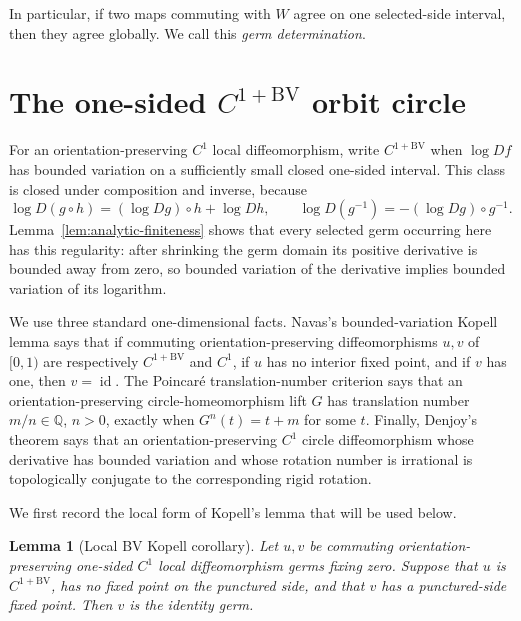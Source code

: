 \documentclass[11pt]{article}
\newtheorem{lemma}[theorem]{Lemma}
\theoremstyle{definition}
\theoremstyle{remark}
\newcommand{\id}{\operatorname{id}}
\begin{document}
In particular, if two maps commuting with \(W\) agree on one selected-side
interval, then they agree globally.  We call this \emph{germ
determination}.

\section{The one-sided \texorpdfstring{\(C^{1+\mathrm{BV}}\)}{C1+BV} orbit circle}

For an orientation-preserving \(C^1\) local diffeomorphism, write
\(C^{1+\mathrm{BV}}\) when \(\log Df\) has bounded variation on a sufficiently
small closed one-sided interval.  This class is closed under composition and
inverse, because
\[
 \log D(g\circ h)=(\log Dg)\circ h+\log Dh,
 \qquad
 \log D(g^{-1})=-(\log Dg)\circ g^{-1}.
\]
Lemma~\ref{lem:analytic-finiteness} shows that every selected germ occurring
here has this regularity: after shrinking the germ domain its positive
derivative is bounded away from zero, so bounded variation of the derivative
implies bounded variation of its logarithm.

We use three standard one-dimensional facts.  Navas's
bounded-variation Kopell lemma \cite[Theorem 4.1.1]{Navas} says that if
commuting orientation-preserving diffeomorphisms $u,v$ of $[0,1)$ are
respectively $C^{1+\mathrm{BV}}$ and $C^1$, if $u$ has no interior fixed
point, and if $v$ has one, then $v=\id$.  The Poincar\'e translation-number
criterion \cite[Propositions 2.2.2 and 2.2.3]{Navas} says that an
orientation-preserving circle-homeomorphism lift $G$ has translation number
$m/n\in\mathbb Q$, $n>0$, exactly when $G^n(t)=t+m$ for some $t$.
Finally, Denjoy's theorem
\cite[Theorem 3.1.1]{Navas} says that an orientation-preserving $C^1$ circle
diffeomorphism whose derivative has bounded variation and whose rotation
number is irrational is topologically conjugate to the corresponding rigid
rotation.

We first record the local form of Kopell's lemma that will be used below.

\begin{lemma}[Local BV Kopell corollary]\label{lem:local-BV-Kopell}
Let \(u,v\) be commuting orientation-preserving one-sided \(C^1\) local
diffeomorphism germs fixing zero.  Suppose that \(u\) is
\(C^{1+\mathrm{BV}}\), has no fixed point on the punctured side, and that
\(v\) has a punctured-side fixed point.  Then \(v\) is the identity germ.
\end{lemma}
\end{document}
